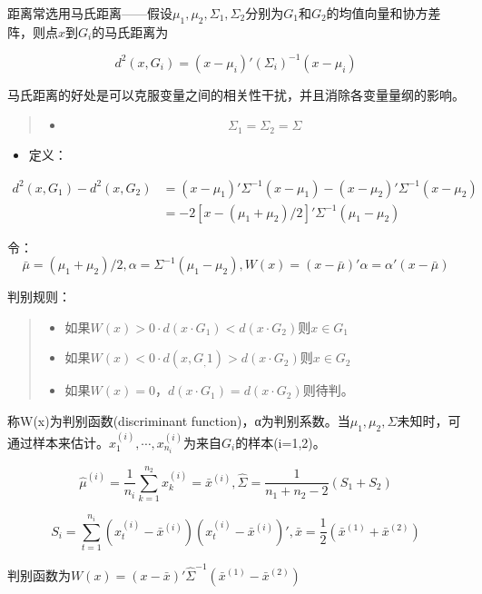 \documentclass[]{ctexbook}
\providecommand{\tightlist}{%
  \setlength{\itemsep}{0pt}\setlength{\parskip}{0pt}}
\begin{document}
距离常选用马氏距离------假设\(\mu_1,\mu_2,\Sigma_1,\Sigma_2\)分别为\(G_1\)和\(G_2\)的均值向量和协方差阵，则点\(x\)到\(G_i\)的马氏距离为

\[d^2(x,G_i)=(x-\mu_i)'(\Sigma_i)^{-1}(x-\mu_i)\]

马氏距离的好处是可以克服变量之间的相关性干扰，并且消除各变量量纲的影响。

\begin{quote}
\begin{itemize}
\tightlist
\item
  \[\Sigma_1=\Sigma_2=\Sigma\]
\end{itemize}
\end{quote}

\begin{itemize}
\tightlist
\item
  定义：
\end{itemize}

\[\begin{aligned}
d^2(x,G_1)-d^2(x,G_2) & =(x-\mu_1)'\Sigma^{-1}(x-\mu_1)-(x-\mu_2)'\Sigma^{-1}(x-\mu_2) \\ &=-2[x-(\mu_1+\mu_2)/2]'\Sigma^{-1}(\mu_1-\mu_2) \end{aligned}\]

令：\[\bar\mu=(\mu_1+\mu_2)/2, \alpha=\Sigma^{-1}(\mu_1-\mu_2),W(x)=(x-\bar\mu)'\alpha=\alpha'(x-\bar\mu)\]

判别规则：

\begin{quote}
\begin{itemize}
\tightlist
\item
  如果\(W(x)>0\cdot d(x\cdot G_1) < d(x\cdot G_2)\)则\(x\in G_1\)
\item
  如果\(W(x)<0\cdot d(x,G_,1) > d(x\cdot G_2)\)则\(x\in G_2\)
\item
  如果\(W(x)=0，d(x\cdot G_1) = d(x\cdot G_2)\)则待判。
\end{itemize}
\end{quote}

称W(x)为判别函数(discriminant function)，α为判别系数。当\(\mu_1,\mu_2,\Sigma\)未知时，可通过样本来估计。\(x_1^{(i)},\cdots,x_{n_i}^{(i)}\)为来自\(G_i\)的样本(i=1,2)。

\[\hat\mu^{(i)}=\frac{1}{n_i}\sum_{k=1}^{n_2}x_k^{(i)}=\bar x^{(i)},\hat \Sigma=\frac{1}{n_1+n_2-2}(S_1+S_2)\]

\[S_i=\sum_{t=1}^{n_i}(x_t^{(i)}-\bar x^{(i)})(x_t^{(i)}-\bar x^{(i)})',\bar x=\frac{1}{2}(\bar x^{(1)}+\bar x^{(2)})\]

判别函数为\(W(x)=(x-\bar x)'\hat \Sigma^{-1}(\bar x^{(1)}-\bar x^{(2)})\)
\end{document}
